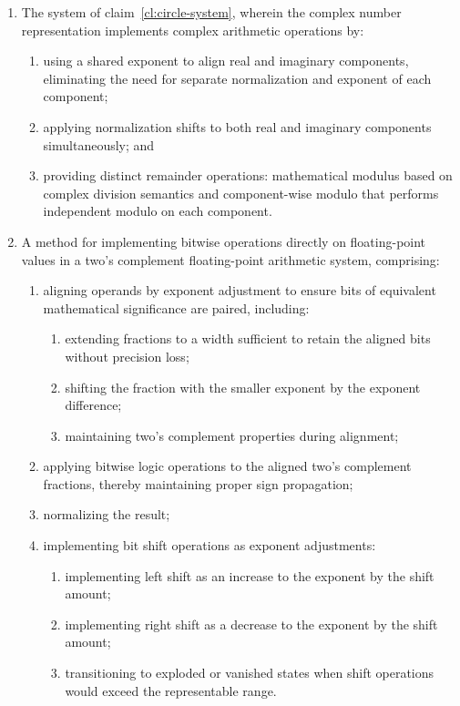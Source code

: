 \documentclass[12pt,letter]{article}
\begin{document}
\begin{enumerate}
    \item The system of claim~\ref{cl:circle-system}, wherein the complex number representation implements complex arithmetic operations by:
          \begin{enumerate}
              \item using a shared exponent to align real and imaginary components, eliminating the need for separate normalization and exponent of each component;
              \item applying normalization shifts to both real and imaginary components simultaneously; and
              \item providing distinct remainder operations: mathematical modulus based on complex division semantics and component-wise modulo that performs independent modulo on each component.
          \end{enumerate}

          \item\label{cl:bitwise-method} A method for implementing bitwise operations directly on floating-point values in a two's complement floating-point arithmetic system, comprising:
          \begin{enumerate}
              \item aligning operands by exponent adjustment to ensure bits of equivalent mathematical significance are paired, including:
                    \begin{enumerate}
                        \item extending fractions to a width sufficient to retain the aligned bits without precision loss;
                        \item shifting the fraction with the smaller exponent by the exponent difference;
                        \item maintaining two's complement properties during alignment;
                    \end{enumerate}
              \item applying bitwise logic operations to the aligned two's complement fractions, thereby maintaining proper sign propagation;
              \item normalizing the result;
              \item implementing bit shift operations as exponent adjustments:
                    \begin{enumerate}
                        \item implementing left shift as an increase to the exponent by the shift amount;
                        \item implementing right shift as a decrease to the exponent by the shift amount;
                        \item transitioning to exploded or vanished states when shift operations would exceed the representable range.
                    \end{enumerate}
          \end{enumerate}


\end{enumerate}
\end{document}
